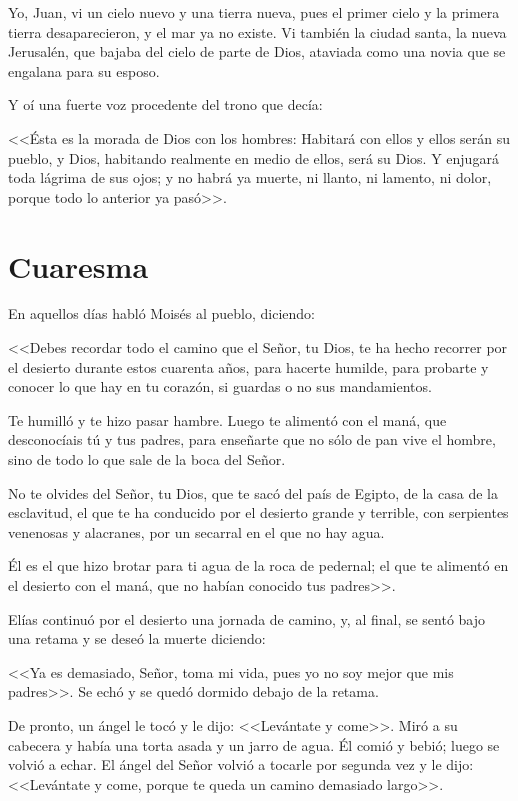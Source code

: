  
Yo, Juan, vi un cielo nuevo y una tierra nueva, 
pues el primer cielo y la primera tierra 
desaparecieron, y el mar ya no existe. Vi 
también la ciudad santa, la nueva Jerusalén, 
que bajaba del cielo de parte de Dios, ataviada 
como una novia que se engalana para su 
esposo. 

Y oí una fuerte voz procedente del 
trono que decía: 

<<Ésta es la morada de Dios 
con los hombres: Habitará con ellos y ellos 
serán su pueblo, y Dios, habitando realmente 
en medio de ellos, será su Dios. Y enjugará 
toda lágrima de sus ojos; y no habrá ya 
muerte, ni llanto, ni lamento, ni dolor, porque 
todo lo anterior ya pasó>>. 

\newpage
\section{Cuaresma}


 En aquellos días habló Moisés al pueblo, 
diciendo: 

<<Debes recordar todo el camino que 
el Señor, tu Dios, te ha hecho recorrer por el 
desierto durante estos cuarenta años, para 
hacerte humilde, para probarte y conocer lo 
que hay en tu corazón, si guardas o no sus 
mandamientos. 

Te humilló y te hizo pasar 
hambre. Luego te alimentó con el maná, que 
desconocíais tú y tus padres, para enseñarte 
que no sólo de pan vive el hombre, sino de 
todo lo que sale de la boca del Señor.

 No te 
olvides del Señor, tu Dios, que te sacó del país 
de Egipto, de la casa de la esclavitud, el que te 
ha conducido por el desierto grande y terrible, 
con serpientes venenosas y alacranes, por un 
secarral en el que no hay agua. 

Él es el que 
hizo brotar para ti agua de la roca de pedernal; 
el que te alimentó en el desierto con el maná, 
que no habían conocido tus padres>>. 


Elías continuó por el desierto 
una jornada de camino, y, al final, se sentó 
bajo una retama y se deseó la muerte 
diciendo:

<<Ya es demasiado, Señor, toma mi 
vida, pues yo no soy mejor que mis padres>>. 
Se echó y se quedó dormido debajo de la 
retama. 

De pronto, un ángel le tocó y le dijo: 
<<Levántate y come>>. Miró a su cabecera y 
había una torta asada y un jarro de agua. Él 
comió y bebió; luego se volvió a echar. El 
ángel del Señor volvió a tocarle por segunda 
vez y le dijo: <<Levántate y come, porque te 
queda un camino demasiado largo>>. 


